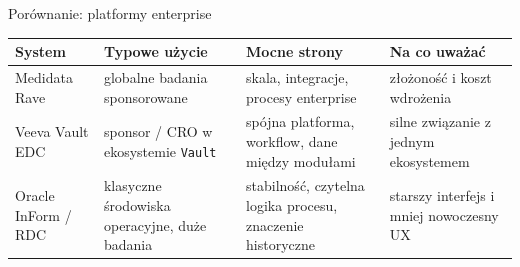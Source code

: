 %


\begin{frame}{Porównanie: platformy enterprise}
  \scriptsize
  \begin{tabular}{p{2.1cm} p{2.4cm} p{2.9cm} p{2.8cm}}
    \textbf{System} & \textbf{Typowe użycie} & \textbf{Mocne strony} & \textbf{Na co uważać} \\
    \hline
    Medidata Rave & globalne badania sponsorowane & skala, integracje, procesy enterprise & złożoność i koszt wdrożenia \\
    \hline
    Veeva Vault EDC & sponsor / CRO w ekosystemie \texttt{Vault} & spójna platforma, workflow, dane między modułami & silne związanie z jednym ekosystemem \\
    \hline
    Oracle InForm / RDC & klasyczne środowiska operacyjne, duże badania & stabilność, czytelna logika procesu, znaczenie historyczne & starszy interfejs i mniej nowoczesny UX \\
  \end{tabular}
\end{frame}

